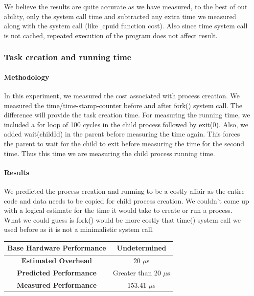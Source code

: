 \documentclass[conference]{IEEEtran}
\begin{document}
We believe the results are quite accurate as we have measured, to the best of out ability, only the system call time and subtracted any extra time we measured along with the system call (like $\_$cpuid function cost). Also since time system call is not cached, repeated execution of the program does not affect result.



\subsubsection{Task creation and running time}

\paragraph{Methodology}
 In this experiment, we measured the cost associated with process creation. We measured the time/time-stamp-counter before and after fork() system call. The difference will provide the task creation time. 
 For measuring the running time, we included a for loop of 100 cycles in the child process followed by exit(0). Also, we added wait(childId) in the parent before measuring the time again. This forces the parent to wait for the child to exit before measuring the time for the second time. Thus this time we are measuring the child process running time.

\paragraph{Results}

We predicted the process creation and running to be a costly affair as the entire code and data needs to be copied for child process creation. We couldn't come up with a logical estimate for the time it would take to create or run a process. What we could guess is fork() would be more costly that time() system call we used before as it is not a minimalistic system call.

\begin{center}
\begin{tabular}{ |c|c| } 
  \hline
  \textbf{Base Hardware Performance} & Undetermined \\ 
  \hline
  \textbf{Estimated Overhead} &  20 $\mu$s \\ 
  \hline
  \textbf{Predicted Performance} & Greater than 20 $\mu$s \\ 
  \hline
  \textbf{Measured Performance} & 153.41 $\mu$s \\ 
  \hline
\end{tabular}
\end{center}
\end{document}
